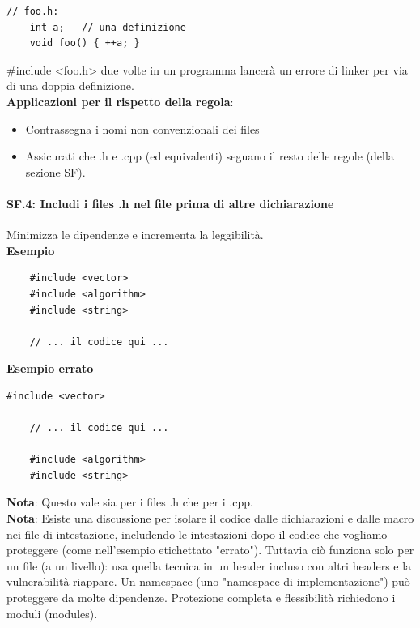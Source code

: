 \begin{lstlisting}[frame=single, rulecolor=\color{red}]
	// foo.h:
	int a;   // una definizione
	void foo() { ++a; }
\end{lstlisting}

\textsf{\small \#include <foo.h> due volte in un programma lancerà un errore di linker per via di una doppia definizione. } \\

\textsf{\small \textbf{Applicazioni per il rispetto della regola}: }

\begin{itemize}
	\item \textsf{\small Contrassegna i nomi non convenzionali dei files}
	\item \textsf{\small Assicurati che .h e .cpp (ed equivalenti) seguano il resto delle regole (della sezione SF).}
\end{itemize}

\paragraph{SF.4: Includi i files .h nel file prima di altre dichiarazione}

\textsf{\small Minimizza le dipendenze e incrementa la leggibilità.} \\

\textsf{\small \textbf{Esempio}}

\begin{lstlisting}
	#include <vector>
	#include <algorithm>
	#include <string>
	
	// ... il codice qui ...
\end{lstlisting}

\textsf{\small \textbf{Esempio errato}}

\begin{lstlisting}[frame=single, rulecolor=\color{red}]
	#include <vector>
	
	// ... il codice qui ...
	
	#include <algorithm>
	#include <string>
\end{lstlisting}

\textsf{\small \textbf{Nota}: Questo vale sia per i files .h che per i .cpp.} \\

\textsf{\small \textbf{Nota}: Esiste una discussione per isolare il codice dalle dichiarazioni e dalle macro nei file di intestazione, includendo le intestazioni dopo il codice che vogliamo proteggere (come nell'esempio etichettato "errato"). Tuttavia ciò funziona solo per un file (a un livello): usa quella tecnica in un header incluso con altri headers e la vulnerabilità riappare. Un namespace (uno "namespace di implementazione") può proteggere da molte dipendenze. Protezione completa e flessibilità richiedono i moduli (modules).} \\ %


